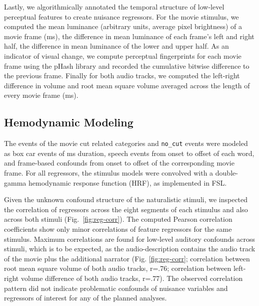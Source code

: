 \documentclass[english]{article}
\begin{document}
Lastly, we algorithmically annotated the temporal structure of low-level
perceptual features to create nuisance regressors.
For the movie stimulus, we computed the mean luminance (arbitrary units,
average pixel brightness) of a movie frame (\unit[40]{ms}), the difference in
mean luminance of each frame's left and right half, the difference in mean
luminance of the lower and upper half.  As an indicator of visual change, we
compute perceptual fingerprints for each movie frame using the pHash library
\citep{zauner2010implementation} and recorded the cumulative bitwise
difference to the previous frame.
Finally for both audio tracks, we computed the left-right difference in volume
and root mean square volume averaged across the length of every movie frame
(\unit[40]{ms}).


\subsection{Hemodynamic Modeling}

The events of the movie cut related categories and \texttt{no\_cut} events were
modeled as box car events of \unit[200]{ms} duration,
%
speech events from onset to offset of each word, and frame-based confounds from
onset to offset of the corresponding movie frame.
For all regressors, the stimulus models were convolved with a double-gamma
hemodynamic response function (HRF), as implemented in FSL.

Given the unknown confound structure of the naturalistic stimuli, we inspected
the correlation of regressors across the eight segments of each stimulus and
also across both stimuli (Fig.~\ref{fig:reg-corr}).
The computed Pearson correlation coefficients show only minor correlations of
feature regressors for the same stimulus.
Maximum correlations are found for low-level auditory confounds across
stimuli,
which is to be expected, as the audio-description contains the audio track of
the movie plus the additional narrator (Fig. \ref{fig:reg-corr}; correlation
between root mean square volume of both audio tracks, r=.76; correlation between
left-right volume difference of both audio tracks, r=.77).
The observed correlation pattern did not indicate problematic confounds of
nuisance variables and regressors of interest for any of the planned analyses.
\end{document}
